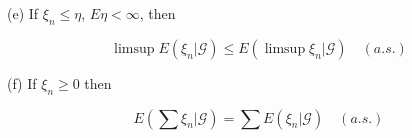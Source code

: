 (e) If $\xi_n \leq \eta$, $E \eta < \infty$, then

$$\limsup E(\xi_n | \mathcal{G}) \leq E(\limsup \xi_n | \mathcal{G}) \quad (a. s.)$$

(f) If $\xi_n \geq 0$ then

$$E(\sum \xi_n | \mathcal{G}) = \sum E(\xi_n | \mathcal{G}) \quad (a. s.)$$
